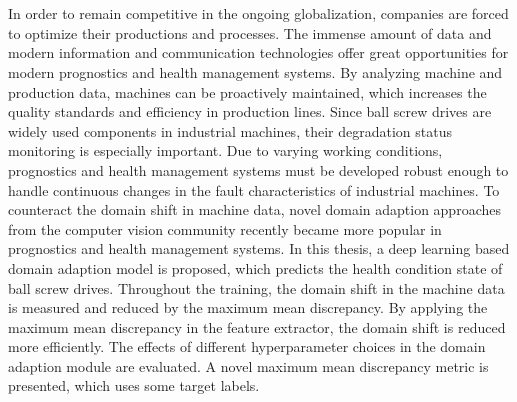 \chapter{\abstractname}

In order to remain competitive in the ongoing globalization, companies are forced to optimize their productions and processes. The immense amount of data and modern information and communication technologies offer great opportunities for modern prognostics and health management systems. By analyzing machine and production data, machines can be proactively maintained, which increases the quality standards and efficiency in production lines. Since ball screw drives are widely used components in industrial machines, their degradation status monitoring is especially important. Due to varying working conditions, prognostics and health management systems must be developed robust enough to handle continuous changes in the fault characteristics of industrial machines. To counteract the domain shift in machine data, novel domain adaption approaches from the computer vision community recently became more popular in prognostics and health management systems. In this thesis, a deep learning based domain adaption model is proposed, which predicts the health condition state of ball screw drives. Throughout the training, the domain shift in the machine data is measured and reduced by the maximum mean discrepancy. By applying the maximum mean discrepancy in the feature extractor, the domain shift is reduced more efficiently. The effects of different hyperparameter choices in the domain adaption module are evaluated. A novel maximum mean discrepancy metric is presented, which uses some target labels. 


\makeatletter
{}
{\renewcommand{\abstractname}{Kurzfassung}}
{\renewcommand{\abstractname}{Abstract}}
\makeatother

\chapter{\abstractname}

